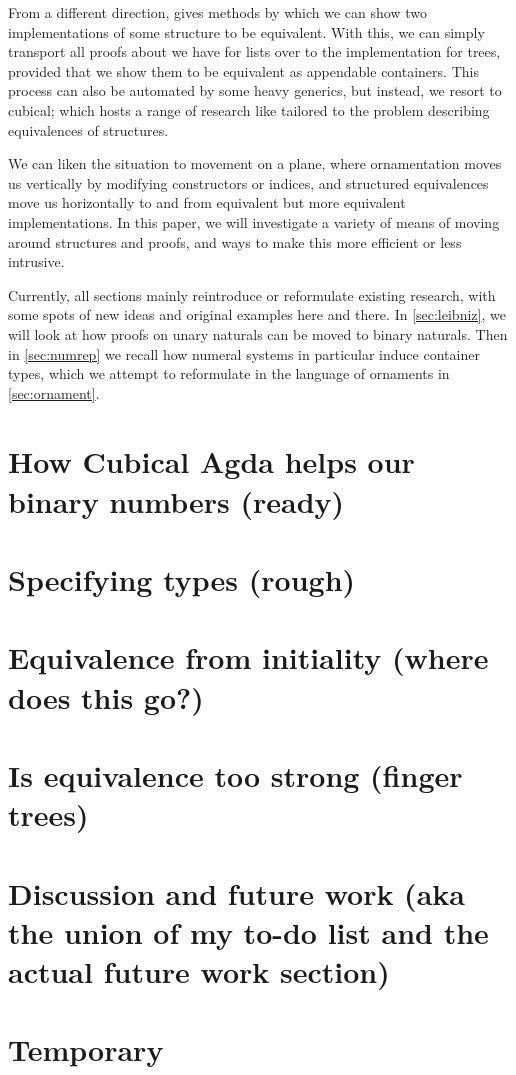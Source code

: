 \documentclass{article}
\begin{document}
From a different direction, \cite{calcdata} gives methods by which we can show two implementations of some structure to be equivalent. With this, we can simply transport all proofs about \AgdaFunction{\_++\_} we have for lists over to the implementation for trees, provided that we show them to be equivalent as appendable containers. This process can also be automated by some heavy generics, but instead, we resort to cubical; which hosts a range of research like \cite{iri} tailored to the problem describing equivalences of structures.

We can liken the situation to movement on a plane, where ornamentation moves us vertically by modifying constructors or indices, and structured equivalences move us horizontally to and from equivalent but more equivalent implementations. In this paper, we will investigate a variety of means of moving around structures and proofs, and ways to make this more efficient or less intrusive.

Currently, all sections mainly reintroduce or reformulate existing research, with some spots of new ideas and original examples here and there. In \autoref{sec:leibniz}, we will look at how proofs on unary naturals can be moved to binary naturals. Then in \autoref{sec:numrep} we recall how numeral systems in particular induce container types, which we attempt to reformulate in the language of ornaments in \autoref{sec:ornament}.


\section{How Cubical Agda helps our binary numbers (ready)}\label{sec:leibniz}



\section{Specifying types (rough)}\label{sec:numrep}



\section{Equivalence from initiality (where does this go?)}\label{sec:initiality}



\section{Is equivalence too strong (finger trees)}\label{sec:weakening}



\section{Discussion and future work (aka the union of my to-do list and the actual future work section)}\label{sec:discussion}



\section{Temporary}\label{sec:temp}
\listoftodos
%


\printbibliography
\end{document}
